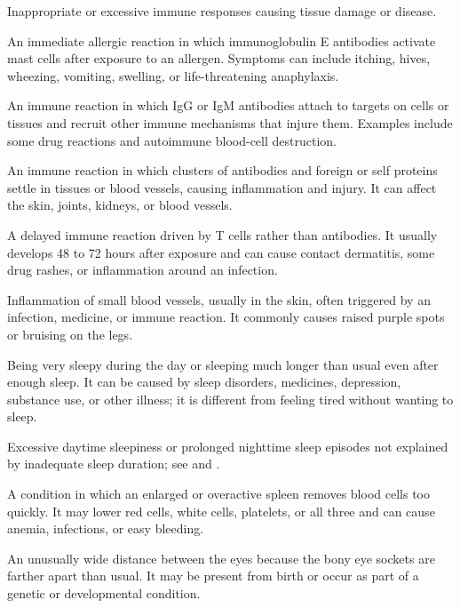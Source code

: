  Inappropriate or excessive immune responses causing tissue damage or disease.

 An immediate allergic reaction in which immunoglobulin E antibodies activate mast cells after exposure to an allergen. Symptoms can include itching, hives, wheezing, vomiting, swelling, or life-threatening anaphylaxis.

 An immune reaction in which IgG or IgM antibodies attach to targets on cells or tissues and recruit other immune mechanisms that injure them. Examples include some drug reactions and autoimmune blood-cell destruction.

 An immune reaction in which clusters of antibodies and foreign or self proteins settle in tissues or blood vessels, causing inflammation and injury. It can affect the skin, joints, kidneys, or blood vessels.

 A delayed immune reaction driven by T cells rather than antibodies. It usually develops 48 to 72 hours after exposure and can cause contact dermatitis, some drug rashes, or inflammation around an infection.

 Inflammation of small blood vessels, usually in the skin, often triggered by an infection, medicine, or immune reaction. It commonly causes raised purple spots or bruising on the legs.

 Being very sleepy during the day or sleeping much longer than usual even after enough sleep. It can be caused by sleep disorders, medicines, depression, substance use, or other illness; it is different from feeling tired without wanting to sleep.

 Excessive daytime sleepiness or prolonged nighttime sleep episodes not explained by inadequate sleep duration; see  and .

 A condition in which an enlarged or overactive spleen removes blood cells too quickly. It may lower red cells, white cells, platelets, or all three and can cause anemia, infections, or easy bleeding.

 An unusually wide distance between the eyes because the bony eye sockets are farther apart than usual. It may be present from birth or occur as part of a genetic or developmental condition.

